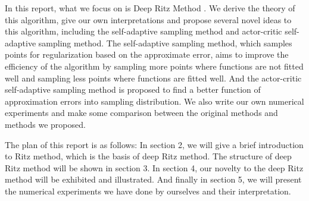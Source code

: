 \documentclass{article}
\begin{document}
\par In this report, what we focus on is Deep Ritz Method \cite{yu2017deep}. We derive the theory of this algorithm, give our own interpretations and propose several novel ideas to this algorithm, including the self-adaptive sampling method and actor-critic self-adaptive sampling method. The self-adaptive sampling method, which samples points for regularization based on the approximate error, aims to improve the efficiency of the algorithm by sampling more points where functions are not fitted well and sampling less points where functions are fitted well. And the actor-critic self-adaptive sampling method is proposed to find a better function of approximation errors into sampling distribution. We also write our own numerical experiments and make some comparison between the original methods and methods we proposed.
\par The plan of this report is as follows: In section 2, we will give a brief introduction to Ritz method, which is the basis of deep Ritz method. The structure of deep Ritz method will be shown in section 3. In section 4, our novelty to the deep Ritz method will be exhibited and illustrated. And finally in section 5, we will present the numerical experiments we have done by ourselves and their interpretation.
\end{document}

